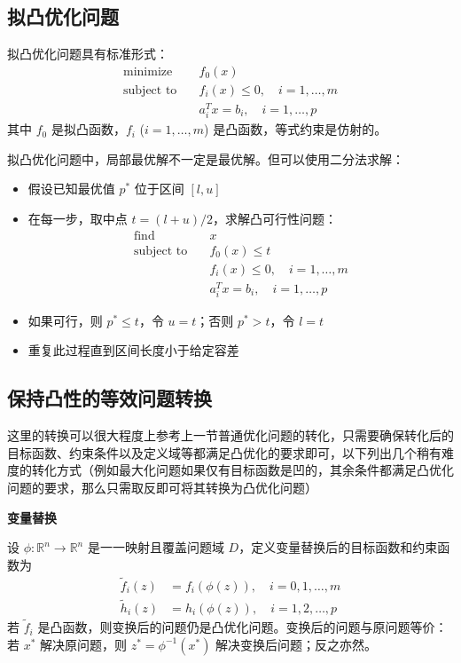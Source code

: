 \documentclass[12pt,a4paper]{book}
\begin{document}
\subsection{拟凸优化问题}

拟凸优化问题具有标准形式：
\[
\begin{aligned}
\text{minimize} \quad & f_0(x) \\
\text{subject to} \quad & f_i(x) \leq 0, \quad i = 1, \dots, m \\
& a_i^T x = b_i, \quad i = 1, \dots, p
\end{aligned}
\]
其中 $f_0$ 是拟凸函数，$f_i$ ($i=1,\dots,m$) 是凸函数，等式约束是仿射的。

拟凸优化问题中，局部最优解不一定是最优解。但可以使用二分法求解：
\begin{itemize}
    \item 假设已知最优值 $p^*$ 位于区间 $[l,u]$
    \item 在每一步，取中点 $t = (l+u)/2$，求解凸可行性问题：
    \[
    \begin{aligned}
    \text{find} \quad & x \\
    \text{subject to} \quad & f_0(x) \leq t \\
    & f_i(x) \leq 0, \quad i = 1, \dots, m \\
    & a_i^T x = b_i, \quad i = 1, \dots, p
    \end{aligned}
    \]
    \item 如果可行，则 $p^* \leq t$，令 $u = t$；否则 $p^* > t$，令 $l = t$
    \item 重复此过程直到区间长度小于给定容差
\end{itemize}

\subsection{保持凸性的等效问题转换}
这里的转换可以很大程度上参考上一节普通优化问题的转化，只需要确保转化后的目标函数、约束条件以及定义域等都满足凸优化的要求即可，以下列出几个稍有难度的转化方式（例如最大化问题如果仅有目标函数是凹的，其余条件都满足凸优化问题的要求，那么只需取反即可将其转换为凸优化问题）

\textbf{变量替换}

设 $\phi: \mathbb{R}^n \to \mathbb{R}^n$ 是一一映射且覆盖问题域 $D$，定义变量替换后的目标函数和约束函数为
\[
\begin{aligned}
\tilde{f}_i(z) &= f_i(\phi(z)), \quad i = 0,1,\dots,m \\
\tilde{h}_i(z) &= h_i(\phi(z)), \quad i = 1,2,\dots,p
\end{aligned}
\]
若 $\tilde{f}_i$ 是凸函数，则变换后的问题仍是凸优化问题。变换后的问题与原问题等价：若 $x^*$ 解决原问题，则 $z^* = \phi^{-1}(x^*)$ 解决变换后问题；反之亦然。
\end{document}

